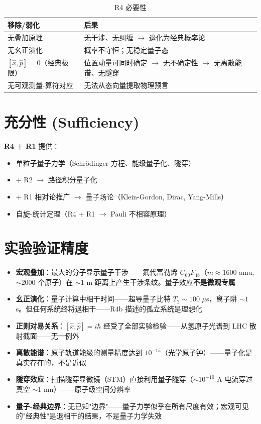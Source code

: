 \begin{table}[h]
\centering
\small
\begin{tabular}{p{5cm}p{7cm}}
\toprule
\textbf{移除/弱化} & \textbf{后果} \\
\midrule
无叠加原理 & 无干涉、无纠缠 $\to$ 退化为经典概率论 \\
无幺正演化 & 概率不守恒；无稳定量子态 \\
$[\hat{x},\hat{p}] = 0$（经典极限） & 位置动量可同时确定 $\to$ 无不确定性 $\to$ 无离散能谱、无隧穿 \\
无可观测量-算符对应 & 无法从态向量提取物理预言 \\
\bottomrule
\end{tabular}
\caption{R4 必要性}
\end{table}

\section{充分性 (Sufficiency)}

\textbf{R4 + R1} 提供：
\begin{itemize}
  \item 单粒子量子力学（Schrödinger 方程、能级量子化、隧穿）
  \item + R2 $\to$ 路径积分量子化
  \item + R1 相对论推广 $\to$ 量子场论（Klein-Gordon, Dirac, Yang-Mills）
  \item 自旋-统计定理（R4 + R1 $\to$ Pauli 不相容原理）
\end{itemize}

\section*{实验验证精度}

\begin{oombox}
  \begin{itemize}
    \item \textbf{宏观叠加}：最大的分子显示量子干涉——氟代富勒烯 $C_{60}F_{48}$（$m \approx 1600$ amu, $\sim 2000$ 个原子）在 $\sim 1$ m 距离上产生干涉条纹。量子效应\textbf{不是微观专属}
    \item \textbf{幺正演化}：量子计算中相干时间——超导量子比特 $T_2 \sim 100$ $\mu$s，离子阱 $\sim 1$ s。但任何系统终将退相干——R4b 描述的孤立系统是理想化
    \item \textbf{正则对易关系}：$[\hat{x},\hat{p}]=i\hbar$ 经受了全部实验检验——从氢原子光谱到 LHC 散射截面——无一例外
    \item \textbf{离散能谱}：原子轨道能级的测量精度达到 $10^{-15}$（光学原子钟）——量子化是真实存在的，不是近似
    \item \textbf{隧穿效应}：扫描隧穿显微镜（STM）直接利用量子隧穿（$\sim 10^{-10}$ A 电流穿过真空 $\sim 1$ nm）——原子级空间分辨率
    \item \textbf{量子-经典边界}：无已知"边界"——量子力学似乎在所有尺度有效；宏观可见的"经典性"是退相干的结果，不是量子力学失效
  \end{itemize}
\end{oombox}

